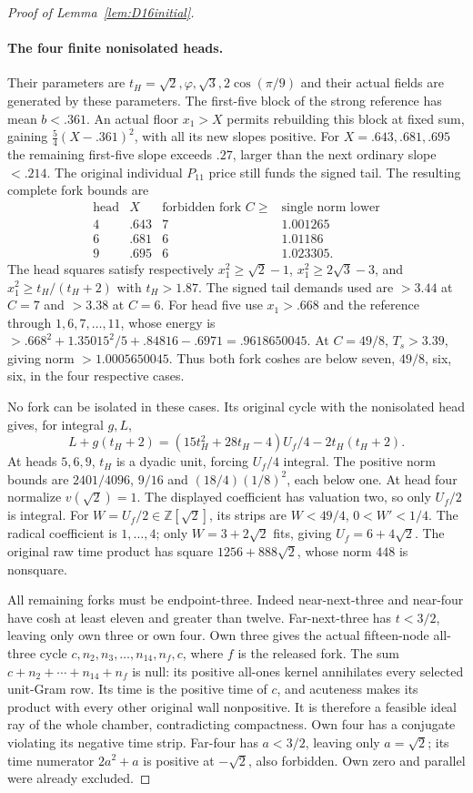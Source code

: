 \documentclass[11pt]{article}
\begin{document}
\begin{proof}[Proof of Lemma~\ref{lem:D16initial}]
\paragraph{The four finite nonisolated heads.}
Their parameters are
$t_H=\sqrt2,\varphi,\sqrt3,2\cos(\pi/9)$ and their actual fields
are generated by these parameters. The first-five block of the
strong reference has mean $b<.361$. An actual floor $x_1>X$
permits rebuilding this block at fixed sum, gaining
$\tfrac54(X-.361)^2$, with all its new slopes positive.
For $X=.643,.681,.695$ the remaining first-five slope exceeds
$.27$, larger than the next ordinary slope $<.214$.
The original individual $P_{11}$ price still funds the signed tail.
The resulting complete fork bounds are
\[
\begin{array}{c|c|c|c}
\text{head}&X&\text{forbidden fork }C\ge&\text{single norm lower}\\\hline
4&.643&7&1.001265\\
6&.681&6&1.01186\\
9&.695&6&1.023305 .
\end{array}
\]
The head squares satisfy respectively
$x_1^2\ge\sqrt2-1$, $x_1^2\ge2\sqrt3-3$,
and $x_1^2\ge t_H/(t_H+2)$ with $t_H>1.87$.
The signed tail demands used are $>3.44$ at $C=7$ and $>3.38$
at $C=6$. For head five use $x_1>.668$ and the reference through
$1,6,7,\ldots,11$, whose energy is
$>.668^2+1.35015^2/5+.84816-.6971=.9618650045$.
At $C=49/8$, $T_s>3.39$, giving norm $>1.0005650045$.
Thus both fork coshes are below seven, $49/8$, six, six,
in the four respective cases.

No fork can be isolated in these cases. Its original cycle with the
nonisolated head gives, for integral $g,L$,
\[
 L+g(t_H+2)=(15t_H^2+28t_H-4)U_f/4-2t_H(t_H+2).
\]
At heads $5,6,9$, $t_H$ is a dyadic unit, forcing $U_f/4$ integral.
The positive norm bounds are $2401/4096$, $9/16$ and
$(18/4)(1/8)^2$, each below one.
At head four normalize $v(\sqrt2)=1$. The displayed coefficient
has valuation two, so only $U_f/2$ is integral.
For $W=U_f/2\in\mathbb Z[\sqrt2]$, its strips are
$W<49/4$, $0<W'<1/4$.
The radical coefficient is $1,\ldots,4$; only $W=3+2\sqrt2$
fits, giving $U_f=6+4\sqrt2$.
The original raw time product has square $1256+888\sqrt2$,
whose norm $448$ is nonsquare.

All remaining forks must be endpoint-three. Indeed near-next-three
and near-four have cosh at least eleven and greater than twelve.
Far-next-three has $t<3/2$, leaving only own three or own four.
Own three gives the actual fifteen-node all-three cycle
$c,n_2,n_3,\ldots,n_{14},n_f,c$, where $f$ is the released fork.
The sum $c+n_2+\cdots+n_{14}+n_f$ is null: its positive all-ones
kernel annihilates every selected unit-Gram row. Its time is the
positive time of $c$, and acuteness makes its product with every
other original wall nonpositive. It is therefore a feasible ideal
ray of the whole chamber, contradicting compactness.
Own four has a conjugate violating its negative time strip.
Far-four has $a<3/2$, leaving only $a=\sqrt2$; its time numerator
$2a^2+a$ is positive at $-\sqrt2$, also forbidden.
Own zero and parallel were already excluded.


\end{proof}
\end{document}
